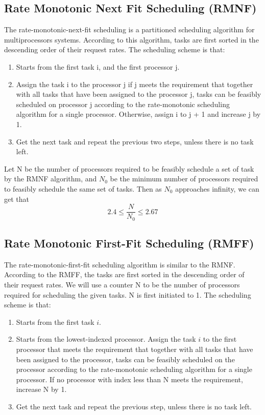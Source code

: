 \documentclass[preprint,12pt]{elsarticle}
\begin{document}
\subsection{Rate Monotonic Next Fit Scheduling (RMNF)}
The rate-monotonic-next-fit scheduling \cite{dhall1978real} is a partitioned scheduling algorithm for multiprocessors systems. According to this algorithm, tasks are first sorted in the descending order of their request rates. The scheduling scheme is that:
\begin{enumerate}
\item Starts from the first task i, and the first processor j. 
\item Assign the task i to the processor j if j meets the requirement that together with all tasks that have been assigned to the processor j, tasks can be feasibly scheduled on processor j according to the rate-monotonic scheduling algorithm for a single processor. Otherwise, assign i to j + 1 and increase j by 1. 
\item Get the next task and repeat the previous two steps, unless there is no task left.
\end{enumerate}

Let N be the number of processors required to be feasibly schedule a set of task by the RMNF algorithm, and $N_0$ be the minimum number of processors required to feasibly schedule the same set of tasks. Then as $N_0$ approaches infinity, we can get that \cite{dhall1978real}
\begin{equation}
    2.4 \leq \frac{N}{N_0} \leq 2.67 
\end{equation}

\subsection{Rate Monotonic First-Fit Scheduling (RMFF)}
The rate-monotonic-first-fit scheduling algorithm \cite{dhall1978real} is similar to the RMNF. According to the RMFF, the tasks are first sorted in the descending order of their request rates. We will use a counter N to be the number of processors required for scheduling the given tasks. N is first initiated to 1. The scheduling scheme is that:
\begin{enumerate}
\item Starts from the first task $i$. 
\item Starts from the lowest-indexed processor. Assign the task $i$ to the first processor that meets the requirement that together with all tasks that have been assigned to the processor, tasks can be feasibly scheduled on the processor according to the rate-monotonic scheduling algorithm for a single processor. If no processor with index less than N meets the requirement, increase N by 1. 
\item Get the next task and repeat the previous step, unless there is no task left.
\end{enumerate}
\end{document}
